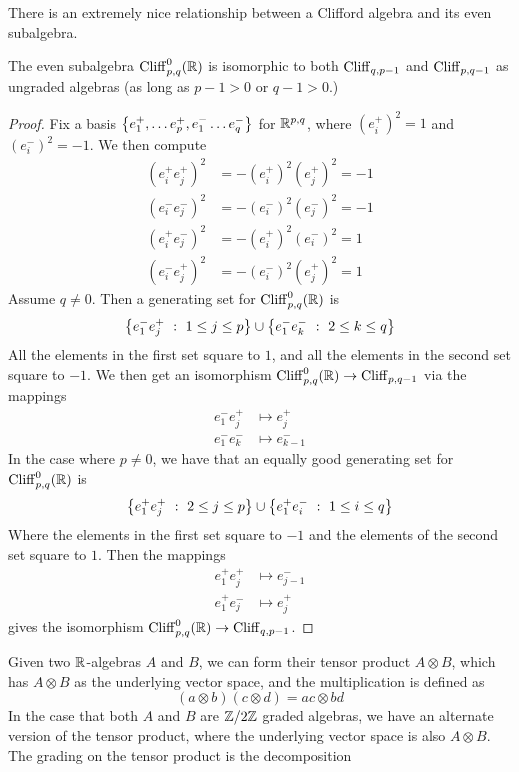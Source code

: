 There is an extremely nice relationship between a Clifford algebra
and its even subalgebra.
%
\begin{thm}
The even subalgebra $\operatorname{Cliff}_{p,q}^0(\mathbb{R})$ is isomorphic to both $\operatorname{Cliff}_{q, p-1}$
and $\operatorname{Cliff}_{p,q-1}$ as ungraded algebras (as long as $p-1 > 0$ or $q-1 > 0$.)
\end{thm}
%
\begin{proof}
Fix a basis $\left\lbrace e_1^+, \ldots e_p^+, e_1^- \ldots e_q^- \right\rbrace$ for $\mathbb{R}^{p,q}$, where
$(e_i^+)^2 = 1$ and $(e_i^-)^2 = -1$. We then compute
%
\begin{align*}
(e_i^+e_j^+)^2 & = -(e_i^+)^2(e_j^+)^2 = -1 \\
(e_i^-e_j^-)^2 & = -(e_i^-)^2(e_j^-)^2 = -1 \\
(e_i^+e_j^-)^2 & = -(e_i^+)^2(e_i^-)^2 = 1  \\
(e_i^-e_j^+)^2 & = -(e_i^-)^2(e_j^+)^2 = 1
\end{align*}
%
Assume $q \neq 0$. Then a generating set for $\operatorname{Cliff}_{p,q}^0(\mathbb{R})$ is
\[
\left\lbrace e_1^-e_j^+ ~:~ 1 \leq j \leq p \right\rbrace \cup \left\lbrace e_1^-e_k^- ~:~ 2 \leq k \leq q \right\rbrace
\]
All the elements in the first set square to $1$, and all the elements in the
second set square to $-1$. We then get an isomorphism
$\operatorname{Cliff}^0_{p,q}(\mathbb{R}) \to \operatorname{Cliff}_{p,q-1}$ via the mappings
\begin{align*}
e_1^-e_j^+ & \mapsto e_j^+     \\
e_1^-e_k^- & \mapsto e_{k-1}^-
\end{align*}
In the case where $p \neq 0$, we have that an equally good generating set for
$\operatorname{Cliff}_{p,q}^0(\mathbb{R})$ is
\[
\left\lbrace e^+_1e_j^+ ~:~ 2 \leq j \leq p \right\rbrace \cup \left\lbrace e_1^+e_i^- ~:~ 1 \leq i \leq q \right\rbrace
\]
Where the elements in the first set square to $-1$ and the elements of the second
set square to $1$. Then the mappings
\begin{align*}
e_1^+e_j^+ & \mapsto e_{j-1}^- \\
e_1^+e_j^- & \mapsto e_j^+
\end{align*}
gives the isomorphism $\operatorname{Cliff}_{p,q}^0(\mathbb{R}) \to \operatorname{Cliff}_{q, p-1}$.
\end{proof}
%
Given two $\mathbb{R}$-algebras $A$ and $B$, we can form their tensor product
$A \otimes B$, which has $A \otimes B$ as the underlying vector space, and the
multiplication is defined as
\[
(a \otimes b)(c \otimes d) = ac \otimes bd
\]
In the case that both $A$ and $B$ are $\mathbb{Z}/2\mathbb{Z}$ graded algebras, we have an alternate
version of the tensor product, where the underlying vector space is also
$A \otimes B$. The grading on the tensor product is the decomposition
